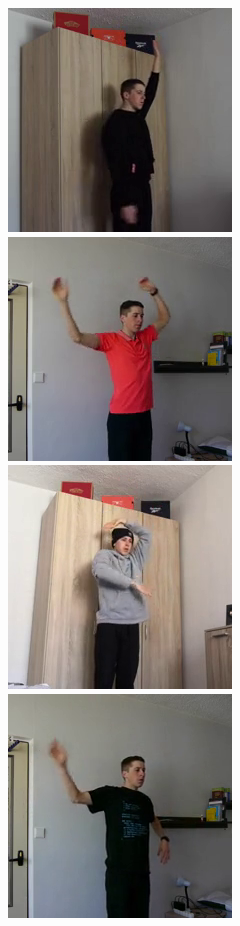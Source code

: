 \begin{figure}[!ht]
{    }
    \vspace{0.1cm}
    \centerline{
        \includegraphics[scale=0.46]{figures/dataset_upper_body/scene026_cam0_image00182.png}
        \includegraphics[scale=0.46]{figures/dataset_upper_body/scene020_cam0_image00026.png}
        \includegraphics[scale=0.46]{figures/dataset_upper_body/scene027_cam2_image00022.png}
        \includegraphics[scale=0.46]{figures/dataset_upper_body/scene021_cam0_image00006.png}
}
\end{figure}
